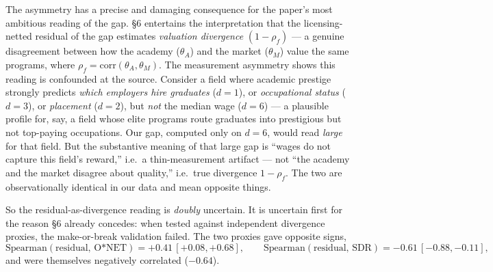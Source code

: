 \documentclass[11pt]{article}
\begin{document}
The asymmetry has a precise and damaging consequence for the paper's most ambitious reading of the gap. \S6 entertains the interpretation that the licensing-netted residual of the gap estimates \emph{valuation divergence} $(1-\rho_f)$ --- a genuine disagreement between how the academy ($\theta_A$) and the market ($\theta_M$) value the same programs, where $\rho_f = \mathrm{corr}(\theta_A,\theta_M)$. The measurement asymmetry shows this reading is confounded at the source. Consider a field where academic prestige strongly predicts \emph{which employers hire graduates} ($d=1$), or \emph{occupational status} ($d=3$), or \emph{placement} ($d=2$), but \emph{not} the median wage ($d=6$) --- a plausible profile for, say, a field whose elite programs route graduates into prestigious but not top-paying occupations. Our gap, computed only on $d=6$, would read \emph{large} for that field. But the substantive meaning of that large gap is ``wages do not capture this field's reward,'' i.e.\ a thin-measurement artifact --- not ``the academy and the market disagree about quality,'' i.e.\ true divergence $1-\rho_f$. The two are observationally identical in our data and mean opposite things.

So the residual-as-divergence reading is \emph{doubly} uncertain. It is uncertain first for the reason \S6 already concedes: when tested against independent divergence proxies, the make-or-break validation failed. The two proxies gave opposite signs,
\[
\mathrm{Spearman}(\text{residual},\,\text{O*NET}) = +0.41\,[+0.08,+0.68], \qquad \mathrm{Spearman}(\text{residual},\,\text{SDR}) = -0.61\,[-0.88,-0.11],
\]
and were themselves negatively correlated ($-0.64$).
\end{document}
